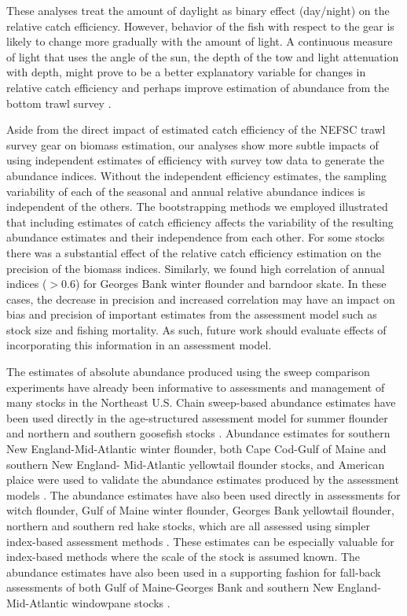 \documentclass[
  12pt,
]{article}
\begin{document}
These analyses treat the amount of daylight as binary effect (day/night)
on the relative catch efficiency. However, behavior of the fish with
respect to the gear is likely to change more gradually with the amount
of light. A continuous measure of light that uses the angle of the sun,
the depth of the tow and light attenuation with depth, might prove to be
a better explanatory variable for changes in relative catch efficiency
and perhaps improve estimation of abundance from the bottom trawl survey
\citep{jacobsonetal15,kaingeetal17}.

Aside from the direct impact of estimated catch efficiency of the NEFSC
trawl survey gear on biomass estimation, our analyses show more subtle
impacts of using independent estimates of efficiency with survey tow
data to generate the abundance indices. Without the independent
efficiency estimates, the sampling variability of each of the seasonal
and annual relative abundance indices is independent of the others. The
bootstrapping methods we employed illustrated that including estimates
of catch efficiency affects the variability of the resulting abundance
estimates and their independence from each other. For some stocks there
was a substantial effect of the relative catch efficiency estimation on
the precision of the biomass indices. Similarly, we found high
correlation of annual indices (\(> 0.6\)) for Georges Bank winter
flounder and barndoor skate. In these cases, the decrease in precision
and increased correlation may have an impact on bias and precision of
important estimates from the assessment model such as stock size and
fishing mortality. As such, future work should evaluate effects of
incorporating this information in an assessment model.

The estimates of absolute abundance produced using the sweep comparison
experiments have already been informative to assessments and management
of many stocks in the Northeast U.S. Chain sweep-based abundance
estimates have been used directly in the age-structured assessment model
for summer flounder and northern and southern goosefish stocks
\citep{nefsc19, nefsc20b}. Abundance estimates for southern New
England-Mid-Atlantic winter flounder, both Cape Cod-Gulf of Maine and
southern New England- Mid-Atlantic yellowtail flounder stocks, and
American plaice were used to validate the abundance estimates produced
by the assessment models \citep{nefsc20}. The abundance estimates have
also been used directly in assessments for witch flounder, Gulf of Maine
winter flounder, Georges Bank yellowtail flounder, northern and southern
red hake stocks, which are all assessed using simpler index-based
assessment methods \citep{legaultmccurdy17,nefsc20, nefsc20a}. These
estimates can be especially valuable for index-based methods where the
scale of the stock is assumed known. The abundance estimates have also
been used in a supporting fashion for fall-back assessments of both Gulf
of Maine-Georges Bank and southern New England-Mid-Atlantic windowpane
stocks \citep{nefsc20}.
\end{document}
